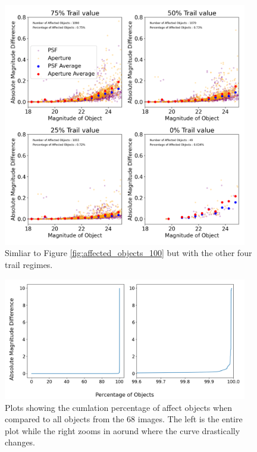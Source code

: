 \documentclass[DM,authoryear,toc]{lsstdoc}
\begin{document}
\begin{figure}[!htp]
  \centering
  \includegraphics[width=0.95\textwidth, angle=0]{Trail_75_0.png}
  \caption{
  Simliar to Figure \ref{fig:affected_objects_100} but with the other four trail regimes.
  }\label{fig:affected_objects_other}
\end{figure}

\begin{figure}[!htp]
  \centering
  \includegraphics[width=0.95\textwidth, angle=0]{Cumlative_Percent.png}
  \caption{
  Plots showing the cumlation percentage of affect objects when compared to all objects from the 68 images. 
  The left is the entire plot while the right zooms in aorund where the curve drastically changes.
  }\label{fig:cuml}
\end{figure}
\end{document}

